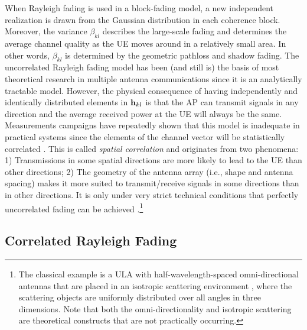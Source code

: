 When Rayleigh fading is used in a block-fading model, a new independent realization is drawn from the Gaussian distribution in each coherence block.
Moreover, the variance $\beta_{kl}$ describes the large-scale fading and determines the average channel quality as the UE moves around in a relatively small area.
In other words, $\beta_{kl}$ is determined by the geometric pathloss and shadow fading. The uncorrelated Rayleigh fading model has been (and still is) the basis of most theoretical research in multiple antenna communications since it is an analytically tractable model.
However, the physical consequence of having independently and identically distributed elements in $\mathbf{h}_{kl}$ is that the AP can transmit signals in any direction and the average received power at the UE will always be the same. 
Measurements campaigns have repeatedly shown that this model is inadequate in practical systems since the elements of the channel vector will be statistically correlated \cite{Sanguinetti2019a}. This is called \emph{spatial correlation} and originates from two phenomena: 1) Transmissions in some spatial directions are more likely to lead to the UE than other directions; 2) The geometry of the antenna array (i.e., shape and antenna spacing) makes it more suited to transmit/receive signals in some directions than in other directions. 
It is only under very strict technical conditions that perfectly uncorrelated fading can be achieved \cite{Pizzo2020}.\footnote{The classical example is a \gls{ULA} with half-wavelength-spaced omni-directional antennas that are placed in an isotropic scattering environment \cite[Sec.~7.2.1]{Marzetta2016a}, where the scattering objects are uniformly distributed over all angles in three dimensions. Note that both the omni-directionality and isotropic scattering are theoretical constructs that are not practically occurring.}


\enlargethispage{\baselineskip} 

 \subsection{Correlated Rayleigh Fading}\label{sec:correlated-rayleigh-fading}

